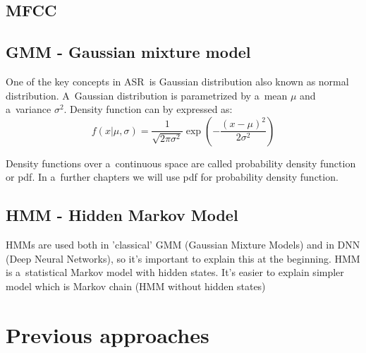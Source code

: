 \documentclass[a4paper]{report}
\theoremstyle{definition}
\begin{document}




\section{MFCC}


\section{}

\section{GMM - Gaussian mixture model}

One of the key concepts in ASR~is Gaussian distribution also known as normal distribution. A~Gaussian distribution is parametrized by a~mean $\mu $ and a~variance $\sigma ^ 2$. Density function can by expressed as:
\begin{equation}
	f(x|\mu,\sigma) = \frac {1}{\sqrt{2\pi\sigma^2}}\exp(-\frac{(x-\mu)^2}{2\sigma ^ 2})
	\label{Gaussion Distribution}
\end{equation}

Density functions over a~continuous space are called probability density function or pdf. In a~further chapters we will use pdf for probability density function.

\section{HMM - Hidden Markov Model}

HMMs are used both in 'classical' GMM (Gaussian Mixture Models) and in DNN (Deep Neural Networks), so it's important to explain this at the beginning. HMM is a~statistical Markov model with hidden states. It's easier to explain simpler model which is Markov chain (HMM without hidden states)


\chapter{Previous approaches}
\end{document}

